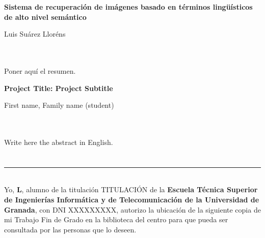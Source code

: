 
\cleardoublepage
\thispagestyle{empty}

\begin{center}
{\large\bfseries Sistema de recuperación de imágenes basado en
términos lingüísticos de alto nivel semántico}\\
\end{center}
\begin{center}
Luis Suárez Lloréns\\
\end{center}

\\

\vspace{0.7cm}
\\

Poner aquí el resumen.
\cleardoublepage


\thispagestyle{empty}


\begin{center}
{\large\bfseries Project Title: Project Subtitle}\\
\end{center}
\begin{center}
First name, Family name (student)\\
\end{center}

\\

\vspace{0.7cm}
\\

Write here the abstract in English.

\chapter*{}
\thispagestyle{empty}

\noindent\rule[-1ex]{\textwidth}{2pt}\\[4.5ex]

Yo, \textbf{L}, alumno de la titulación TITULACIÓN de la \textbf{Escuela Técnica Superior
de Ingenierías Informática y de Telecomunicación de la Universidad de Granada}, con DNI XXXXXXXXX, autorizo la
ubicación de la siguiente copia de mi Trabajo Fin de Grado en la biblioteca del centro para que pueda ser
consultada por las personas que lo deseen.


